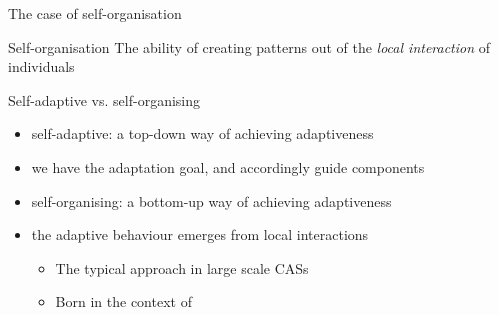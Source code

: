 \documentclass[presentation, 8pt]{beamer}\mode<presentation>{\usetheme{AMSBolognaFC}}
\begin{document}
\begin{frame}{The case of self-organisation}
\begin{alertblock}{Self-organisation}
	\centering
	The ability of creating  patterns out of the \emph{local interaction} of individuals
\end{alertblock}
\begin{exampleblock}{Self-adaptive vs. self-organising}
\begin{itemize}
	\item self-adaptive: a top-down way of achieving adaptiveness
	\item[\faArrowRight] we have the adaptation goal, and accordingly guide components 
	\item self-organising: a bottom-up way of achieving adaptiveness
	\item[\faArrowRight] the adaptive behaviour emerges from local interactions
	\begin{itemize}
		\item The typical approach in large scale CASs
		\item Born in the context of 
	\end{itemize}
\end{itemize}
\end{exampleblock}
\end{frame}
\end{document}
